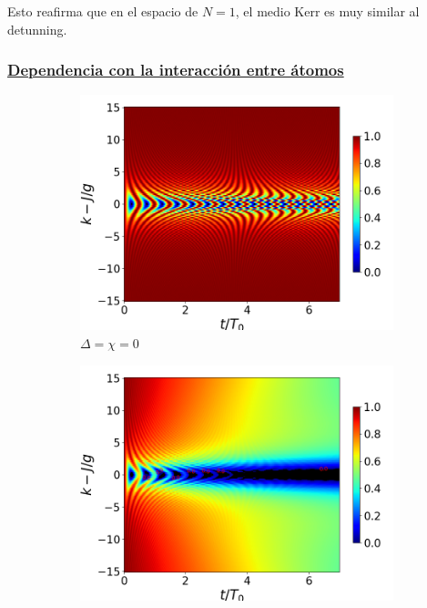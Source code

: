 Esto reafirma que en el espacio de $N=1$, el medio Kerr es muy similar al detunning. 
\newpage
\subsubsection{\underline{Dependencia con la interacción entre átomos}}
\begin{figure}[h!]
    \centering
    \begin{subfigure}{0.49\textwidth}
        \includegraphics[width=\textwidth]{figuras/ch4/concu/k/eg0+ge0 d=0.0g x=0.0g J=15.0g gamma=0.25g concu k uni.png}
        \caption{$\Delta=\chi=0$}
        \label{fig4:concu k 0 uni}
    \end{subfigure}
    \hfill
    \begin{subfigure}{0.49\textwidth}
        \includegraphics[width=\textwidth]{figuras/ch4/concu/k/eg0+ge0 d=0.0g x=0.0g J=15.0g gamma=0.25g concu k dis.png}

\end{subfigure}
\end{figure}
